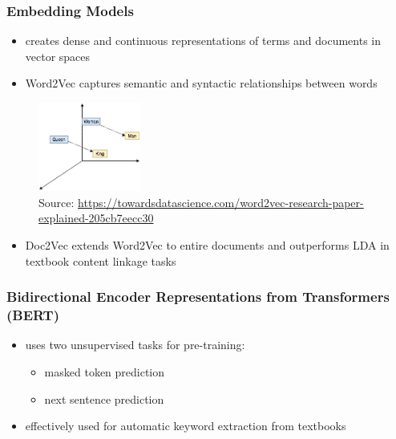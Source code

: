 \documentclass[aspectratio=169]{beamer}
\let\oldparencites\parencites
\renewcommand{\parencites}[1]{{\color{gray}\scriptsize \oldparencites{#1}}}
\newcommand{\source}[1]{\caption*{\tiny Source: \url{#1}}}
\begin{document}
\begin{frame} \frametitle{Embedding Models}

\begin{itemize}
    \item creates dense and continuous representations of terms and documents in vector spaces \pause
    \vspace{-0.5em}
    \item Word2Vec captures semantic and syntactic relationships between words \parencites{mikolov2013} \pause
\end{itemize}

\vspace{-0.5em}
\begin{figure}[h]
    \centering
    \includegraphics[width=0.3\textwidth]{word2vec.png}
    \vspace{-0.5em}
    \source{https://towardsdatascience.com/word2vec-research-paper-explained-205cb7eecc30}
\end{figure} \pause
\vspace{-0.5em}

\begin{itemize}
    \item Doc2Vec extends Word2Vec to entire documents and outperforms LDA in textbook content linkage tasks \parencites{thaker2018}
\end{itemize}

\end{frame}


\begin{frame} \frametitle{Bidirectional Encoder Representations from Transformers (BERT)}

\begin{itemize}
    \item uses two unsupervised tasks for pre-training:
    \begin{itemize} \itemsep0em
        \item masked token prediction
        \item next sentence prediction
    \end{itemize} 
    \parencites{devlin2019} \pause
    \item effectively used for automatic keyword extraction from textbooks \\ \parencites{alpizarchacon2023a}
\end{itemize}

\end{frame}
\end{document}
